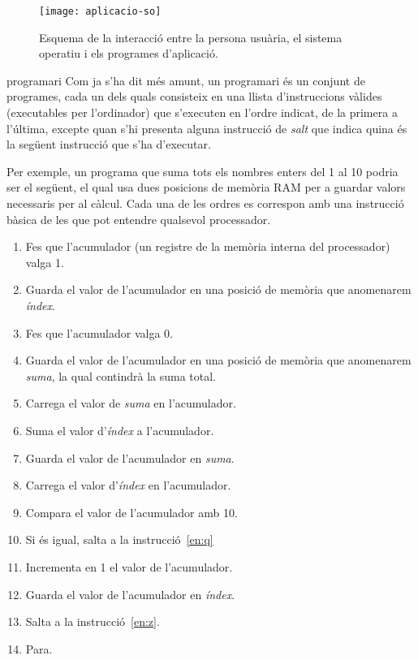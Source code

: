 \begin{figure}
  \centering
  \texttt{[image: aplicacio-so]}
  \caption{Esquema de la interacció entre la persona usuària, el
    sistema operatiu i els programes d'aplicació.}
  \label{fg:aplicacio-so}
\end{figure}



\begin{persabermes}{programari}
Com ja s'ha dit més amunt, un programari és un conjunt de programes,
cada un dels quals consisteix en una llista d'instruccions vàlides
(executables per l'ordinador) que s'executen en l'ordre indicat, de
la primera a l'última, excepte quan s'hi presenta alguna instrucció
de \emph{salt} que indica quina és la següent instrucció que s'ha
d'executar.

Per exemple, un programa que suma tots els nombres enters del 1 al 10
podria ser el següent, el qual usa dues posicions de memòria RAM per a
guardar valors necessaris per al càlcul. Cada una de les ordres es
correspon amb una instrucció bàsica de les que pot entendre qualsevol
processador.
\begin{enumerate}
\item Fes que l'acumulador (un registre de la memòria interna del
  processador) valga 1.
\item Guarda el valor de l'acumulador en una posició de memòria que
  anomenarem \emph{índex}.
\item Fes que l'acumulador valga 0.
\item Guarda el valor de l'acumulador en una posició de memòria que
  anomenarem \emph{suma}, la qual contindrà la suma total.
\item \label{en:z} Carrega el valor de \emph{suma} en l'acumulador.
\item Suma el valor d'\emph{índex} a l'acumulador.
\item Guarda el valor de l'acumulador en \emph{suma}.
\item Carrega el valor d'\emph{índex} en l'acumulador.
\item Compara el valor de l'acumulador amb 10.
\item Si és igual, salta a la instrucció~\ref{en:q}
\item Incrementa en 1 el valor de l'acumulador.
\item Guarda el valor de l'acumulador en \emph{índex}.
\item Salta a la instrucció~\ref{en:z}.
\item \label{en:q} Para.
\end{enumerate}


\end{persabermes}
